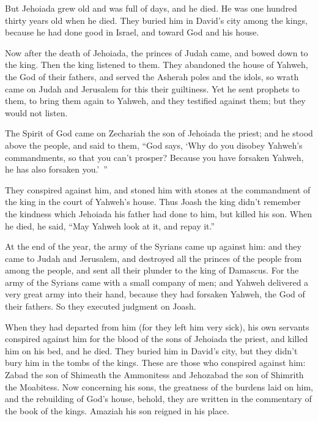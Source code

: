 {\par }{\PP {}But Jehoiada grew old and was full of days, and he died. He was one hundred thirty years old when he died.
They buried him in David’s city among the kings, because he had done good in Israel, and toward God and his house.
\par }{\PP {}Now after the death of Jehoiada, the princes of Judah came, and bowed down to the king. Then the king listened to them.
They abandoned the house of Yahweh, the God of their fathers, and served the Asherah poles and the idols, so wrath came on Judah and Jerusalem for this their guiltiness.
Yet he sent prophets to them, to bring them again to Yahweh, and they testified against them; but they would not listen.
\par }{\PP {}The Spirit of God came on Zechariah the son of Jehoiada the priest; and he stood above the people, and said to them, “God says, ‘Why do you disobey Yahweh’s commandments, so that you can’t prosper? Because you have forsaken Yahweh, he has also forsaken you.’ ”
\par }{\PP {}They conspired against him, and stoned him with stones at the commandment of the king in the court of Yahweh’s house.
Thus Joash the king didn’t remember the kindness which Jehoiada his father had done to him, but killed his son. When he died, he said, “May Yahweh look at it, and repay it.”
\par }{\PP {}At the end of the year, the army of the Syrians came up against him: and they came to Judah and Jerusalem, and destroyed all the princes of the people from among the people, and sent all their plunder to the king of Damascus.
For the army of the Syrians came with a small company of men; and Yahweh delivered a very great army into their hand, because they had forsaken Yahweh, the God of their fathers. So they executed judgment on Joash.
\par }{\PP {}When they had departed from him (for they left him very sick), his own servants conspired against him for the blood of the sons of Jehoiada the priest, and killed him on his bed, and he died. They buried him in David’s city, but they didn’t bury him in the tombs of the kings.
These are those who conspired against him: Zabad the son of Shimeath the Ammonitess and Jehozabad the son of Shimrith the Moabitess.
Now concerning his sons, the greatness of the burdens laid on him, and the rebuilding of God’s house, behold, they are written in the commentary of the book of the kings. Amaziah his son reigned in his place.

}
